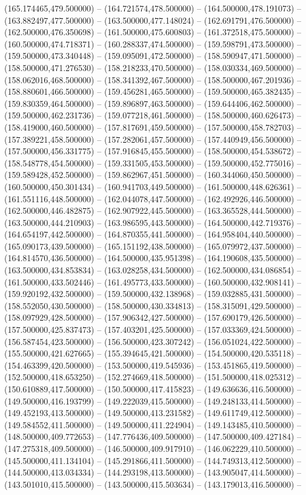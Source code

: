    (165.174465,479.500000) -- (164.721574,478.500000) -- (164.500000,478.191073) -- (163.882497,477.500000) -- (163.500000,477.148024) -- (162.691791,476.500000) -- (162.500000,476.350698) -- (161.500000,475.600803) -- (161.372518,475.500000) -- (160.500000,474.718371) -- (160.288337,474.500000) -- (159.598791,473.500000) -- (159.500000,473.340448) -- (159.095091,472.500000) -- (158.590947,471.500000) -- (158.500000,471.276530) -- (158.218233,470.500000) -- (158.030334,469.500000) -- (158.062016,468.500000) -- (158.341392,467.500000) -- (158.500000,467.201936) -- (158.880601,466.500000) -- (159.456281,465.500000) -- (159.500000,465.382435) -- (159.830359,464.500000) -- (159.896897,463.500000) -- (159.644406,462.500000) -- (159.500000,462.231736) -- (159.077218,461.500000) -- (158.500000,460.626473) -- (158.419000,460.500000) -- (157.817691,459.500000) -- (157.500000,458.782703) -- (157.389221,458.500000) -- (157.282061,457.500000) -- (157.440949,456.500000) -- (157.500000,456.331775) -- (157.916845,455.500000) -- (158.500000,454.538672) -- (158.548778,454.500000) -- (159.331505,453.500000) -- (159.500000,452.775016) -- (159.589428,452.500000) -- (159.862967,451.500000) -- (160.344060,450.500000) -- (160.500000,450.301434) -- (160.941703,449.500000) -- (161.500000,448.626361) -- (161.551116,448.500000) -- (162.044078,447.500000) -- (162.492926,446.500000) -- (162.500000,446.482875) -- (162.907922,445.500000) -- (163.365528,444.500000) -- (163.500000,444.210903) -- (163.986595,443.500000) -- (164.500000,442.719376) -- (164.654197,442.500000) -- (164.870355,441.500000) -- (164.958404,440.500000) -- (165.090173,439.500000) -- (165.151192,438.500000) -- (165.079972,437.500000) -- (164.814570,436.500000) -- (164.500000,435.951398) -- (164.190608,435.500000) -- (163.500000,434.853834) -- (163.028258,434.500000) -- (162.500000,434.086854) -- (161.500000,433.502446) -- (161.495773,433.500000) -- (160.500000,432.908141) -- (159.920192,432.500000) -- (159.500000,432.138968) -- (159.032885,431.500000) -- (158.552050,430.500000) -- (158.500000,430.334813) -- (158.315091,429.500000) -- (158.097929,428.500000) -- (157.906342,427.500000) -- (157.690179,426.500000) -- (157.500000,425.837473) -- (157.403201,425.500000) -- (157.033369,424.500000) -- (156.587454,423.500000) -- (156.500000,423.307242) -- (156.051024,422.500000) -- (155.500000,421.627665) -- (155.394645,421.500000) -- (154.500000,420.535118) -- (154.463399,420.500000) -- (153.500000,419.545936) -- (153.451865,419.500000) -- (152.500000,418.653250) -- (152.274669,418.500000) -- (151.500000,418.025312) -- (150.610889,417.500000) -- (150.500000,417.415823) -- (149.636636,416.500000) -- (149.500000,416.193799) -- (149.222039,415.500000) -- (149.248133,414.500000) -- (149.452193,413.500000) -- (149.500000,413.231582) -- (149.611749,412.500000) -- (149.584552,411.500000) -- (149.500000,411.224904) -- (149.143485,410.500000) -- (148.500000,409.772653) -- (147.776436,409.500000) -- (147.500000,409.427184) -- (147.275318,409.500000) -- (146.500000,409.917910) -- (146.062229,410.500000) -- (145.500000,411.134104) -- (145.291866,411.500000) -- (144.749313,412.500000) -- (144.500000,413.034334) -- (144.293198,413.500000) -- (143.905047,414.500000) -- (143.501010,415.500000) -- (143.500000,415.503634) -- (143.179013,416.500000) -- 
